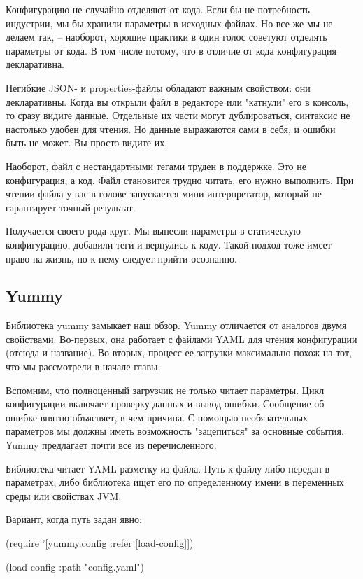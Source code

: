 Конфигурацию не случайно отделяют от кода. Если бы не потребность индустрии, мы
бы хранили параметры в исходных файлах. Но все же мы не делаем так, -- наоборот,
хорошие практики в один голос советуют отделять параметры от кода. В том числе
потому, что в отличие от кода конфигурация декларативна.

Негибкие JSON- и properties-файлы обладают важным свойством: они
декларативны. Когда вы открыли файл в редакторе или "катнули" его в консоль, то
сразу видите данные. Отдельные их части могут дублироваться, синтаксис не
настолько удобен для чтения. Но данные выражаются сами в себя, и ошибки быть не
может. Вы просто видите их.

Наоборот, файл с нестандартными тегами труден в поддержке. Это не конфигурация,
а код. Файл становится трудно читать, его нужно выполнить. При чтении файла у
вас в голове запускается мини-интерпретатор, который не гарантирует точный
результат.

Получается своего рода круг. Мы вынесли параметры в статическую конфигурацию,
добавили теги и вернулись к коду. Такой подход тоже имеет право на жизнь, но к
нему следует прийти осознанно.

\subsection{Yummy}

Библиотека yummy замыкает наш обзор. Yummy отличается от аналогов двумя
свойствами. Во-первых, она работает с файлами YAML для чтения конфигурации
(отсюда и название). Во-вторых, процесс ее загрузки максимально похож на тот,
что мы рассмотрели в начале главы.

Вспомним, что полноценный загрузчик не только читает параметры. Цикл
конфигурации включает проверку данных и вывод ошибки. Сообщение об ошибке внятно
объясняет, в чем причина. С помощью необязательных параметров мы должны иметь
возможность "зацепиться" за основные события. Yummy предлагает почти все из
перечисленного.

Библиотека читает YAML-разметку из файла. Путь к файлу либо передан в
параметрах, либо библиотека ищет его по определенному имени в переменных среды
или свойствах JVM.

Вариант, когда путь задан явно:

\begin{code}
(require '[yummy.config :refer [load-config]])

(load-config {:path "config.yaml"})
\end{code}

